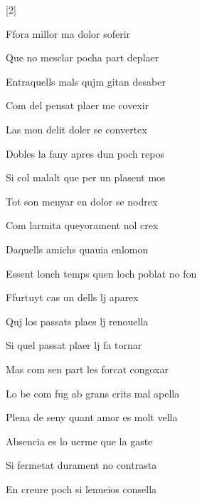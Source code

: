 [2]
\begin{estrofa}

 Ffora millor ma dolor soferir

 Que no mesclar pocha part deplaer

 Entraquells mals qujm gitan desaber

 Com del pensat plaer me covexir

 Las mon delit doler se convertex

 Dobles la fany apres dun poch repos

 Si col malalt que per un plasent mos

 Tot son menyar en dolor se nodrex

\end{estrofa}



\begin{estrofa}

 Com larmita queyorament nol crex

 Daquells amichs quauia enlomon

 Essent lonch temps quen loch poblat no fon

 Ffurtuyt cas un dells lj aparex

 Quj los passats plaes lj renouella

 Si quel passat plaer lj fa tornar

 Mas com sen part les forcat congoxar

 Lo be com fug ab grans crits mal apella

\end{estrofa}



\begin{tornada}

 Plena de seny quant amor es molt vella

 Absencia es lo uerme que la gaste

 Si fermetat durament no contrasta

 En creure poch si lenueios consella

\end{tornada}





